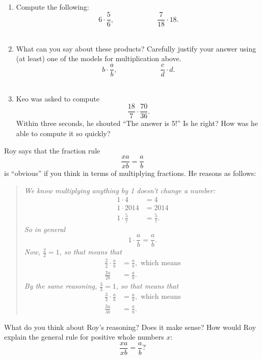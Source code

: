 \begin{thinkpair*}\ 
\begin{enumerate}
\item
Compute the following:
\[
6 \cdot \frac 5 6,
\qquad\qquad\qquad
\frac{7}{18} \cdot 18.
\]\\

\item
What can you say about these products?  Carefully justify your answer using (at least) one of the models for multiplication above.
\[
b \cdot \frac a b,
\qquad\qquad\qquad
\frac cd \cdot d.
\]\\

\item
Keo was asked to compute
\[ 
\frac{18}7 \cdot \frac{70}{36}.
\]
Within three seconds, he shouted ``The answer is 5!''  Is he right?  How was he able to compute it so quickly?\\
\end{enumerate}
\end{thinkpair*}


Roy says that the fraction rule
\[
\frac{xa}{xb} = \frac ab
\]
is ``obvious'' if
you think in terms of multiplying fractions. He reasons as follows:

\begin{quotation}
\emph{
We know multiplying anything by 1 doesn't change a number:
\begin{align*}
1 \cdot 4 &= 4\\
1 \cdot 2014 &= 2014\\
1 \cdot \frac 5 7 &= \frac 5 7.
\end{align*}
So in general
\[
1 \cdot \frac a b = \frac a b.
\]
Now, $\frac 2 2 = 1$, so that means that 
\begin{align*}
\frac 2 2 \cdot \frac a b &= \frac a b, \text{ which means}\\
\frac{2a}{2b} &= \frac a b.
\end{align*}
By the same reasoning, $\frac 3 3  = 1$, so that means that 
\begin{align*}
\frac 3 3 \cdot \frac a b &= \frac a b, \text{ which means}\\
\frac{3a}{3b} &= \frac a b.
\end{align*}
}
\end{quotation}


\begin{thinkpair*}
What do you think about Roy's reasoning?  Does it make sense?
How would Roy explain the general rule for positive whole numbers $x$:
\[
\frac{xa}{xb} = \frac a b?
\]
\end{thinkpair*}




